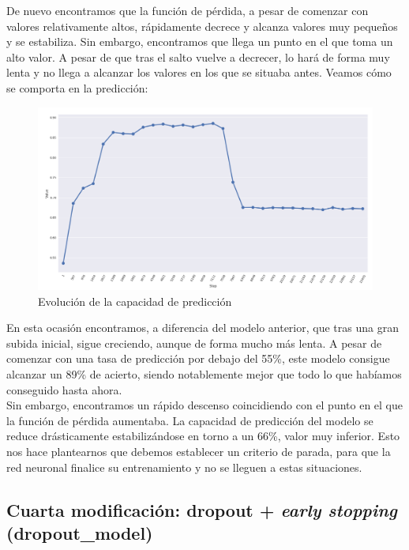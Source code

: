 \documentclass[11pt]{article}
\theoremstyle{plain}
\theoremstyle{definition}
\begin{document}
De nuevo encontramos que la función de pérdida, a pesar de comenzar con 
valores relativamente altos, rápidamente decrece y alcanza valores muy 
pequeños y se estabiliza. Sin embargo, encontramos que llega un punto 
en el que toma un alto valor. A pesar de que tras el salto vuelve a 
decrecer, lo hará de forma muy lenta y no llega a alcanzar los valores
en los que se situaba antes. Veamos cómo se comporta en la predicción:

\begin{figure}[H]
  \centering \includegraphics[width=.95\textwidth]{imgs/accuracy_vlr}
  \caption{Evolución de la capacidad de predicción}
\end{figure}

En esta ocasión encontramos, a diferencia del modelo anterior, que tras
una gran subida inicial, sigue creciendo, aunque de forma mucho más lenta.
A pesar de comenzar con una tasa de predicción por debajo del 55\%, este
modelo consigue alcanzar un 89\% de acierto, siendo notablemente mejor que
todo lo que habíamos conseguido hasta ahora.\\

Sin embargo, encontramos un rápido descenso coincidiendo con el punto en 
el que la función de pérdida aumentaba. La capacidad de predicción del 
modelo se reduce drásticamente estabilizándose en torno a un 66\%, valor 
muy inferior. Esto nos hace plantearnos que debemos establecer un criterio
de parada, para que la red neuronal finalice su entrenamiento y no se 
lleguen a estas situaciones.

\subsection{Cuarta modificación: dropout + \textit{early stopping}
  (dropout\_model)}
\end{document}
